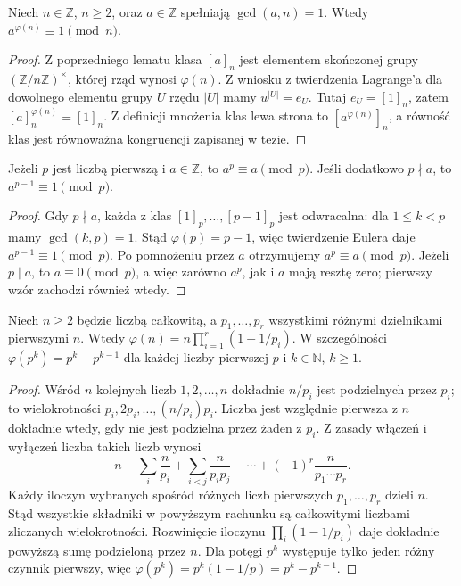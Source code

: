 \begin{twierdzenie}[Eulera]
\label{aa:tw:euler}
Niech $n\in\mathbb Z$, $n\ge2$, oraz $a\in\mathbb Z$ spełniają
$\gcd(a,n)=1$. Wtedy $a^{\varphi(n)}\equiv1\pmod n$.
\end{twierdzenie}
\begin{proof}
Z poprzedniego lematu klasa $[a]_n$ jest elementem
skończonej grupy $(\mathbb Z/n\mathbb Z)^\times$,
której rząd wynosi $\varphi(n)$. Z wniosku z twierdzenia
Lagrange'a dla dowolnego elementu grupy $U$ rzędu $|U|$
mamy $u^{|U|}=e_U$. Tutaj $e_U=[1]_n$,
zatem $[a]_n^{\varphi(n)}=[1]_n$.
Z definicji mnożenia klas lewa strona to
$[a^{\varphi(n)}]_n$, a równość klas jest równoważna
kongruencji zapisanej w tezie.
\end{proof}

\begin{twierdzenie}
\label{aa:tw:fermat}
Jeżeli $p$ jest liczbą pierwszą i $a\in\mathbb Z$,
to $a^p\equiv a\pmod p$. Jeśli dodatkowo $p\nmid a$,
to $a^{p-1}\equiv1\pmod p$.
\end{twierdzenie}
\begin{proof}
Gdy $p\nmid a$, każda z klas $[1]_p,\ldots,[p-1]_p$
jest odwracalna: dla $1\le k<p$ mamy $\gcd(k,p)=1$.
Stąd $\varphi(p)=p-1$, więc twierdzenie Eulera daje
$a^{p-1}\equiv1\pmod p$. Po pomnożeniu przez $a$
otrzymujemy $a^p\equiv a\pmod p$.
Jeżeli $p\mid a$, to $a\equiv0\pmod p$, a więc zarówno
$a^p$, jak i $a$ mają resztę zero; pierwszy wzór zachodzi również wtedy.
\end{proof}

\begin{twierdzenie}
\label{aa:tw:phi-wzor}
Niech $n\ge2$ będzie liczbą całkowitą, a
$p_1,\ldots,p_r$ wszystkimi różnymi dzielnikami pierwszymi $n$.
Wtedy
$\varphi(n)=n\prod_{i=1}^{r}(1-1/p_i)$.
W szczególności $\varphi(p^k)=p^k-p^{k-1}$
dla każdej liczby pierwszej $p$ i $k\in\mathbb N$, $k\ge1$.
\end{twierdzenie}
\begin{proof}
Wśród $n$ kolejnych liczb $1,2,\ldots,n$ dokładnie
$n/p_i$ jest podzielnych przez $p_i$; to wielokrotności
$p_i,2p_i,\ldots,(n/p_i)p_i$.
Liczba jest względnie pierwsza z $n$ dokładnie wtedy,
gdy nie jest podzielna przez żaden z $p_i$.
Z zasady włączeń i wyłączeń liczba takich liczb wynosi
\[
 n-\sum_i\frac n{p_i}+\sum_{i<j}\frac n{p_ip_j}
 -\cdots+(-1)^r\frac n{p_1\cdots p_r}.
\]
Każdy iloczyn wybranych spośród różnych liczb pierwszych
$p_1,\ldots,p_r$ dzieli $n$. Stąd wszystkie składniki
w powyższym rachunku są całkowitymi liczbami zliczanych wielokrotności. Rozwinięcie iloczynu
$\prod_i(1-1/p_i)$ daje dokładnie powyższą sumę podzieloną
przez $n$. Dla potęgi $p^k$ występuje tylko jeden
różny czynnik pierwszy, więc
$\varphi(p^k)=p^k(1-1/p)=p^k-p^{k-1}$.
\end{proof}

